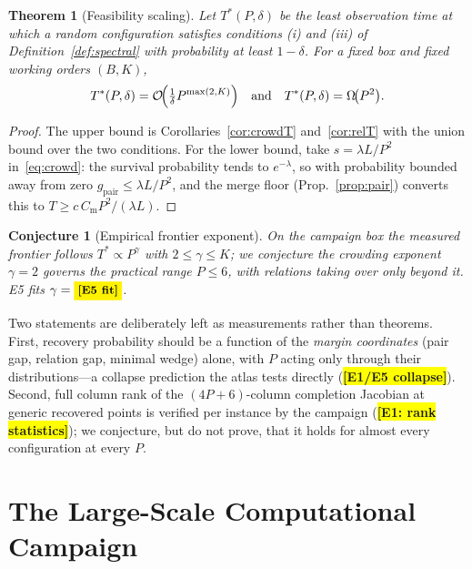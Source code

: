 \documentclass[twocolumn,preprintnumbers,amsmath,amssymb,pra,floatfix]{revtex4-2}
\newcommand{\bigO}{\mathcal{O}}
\newtheorem{theorem}{Theorem}
\newtheorem{conjecture}{Conjecture}
\newcommand{\PH}[1]{\colorbox{yellow}{\textbf{\small [#1]}}}
\begin{document}
\begin{theorem}[Feasibility scaling]
\label{thm:frontier}
Let $T^{*}(P,\delta)$ be the least observation time at which a random
configuration satisfies conditions (i) and (iii) of
Definition~\ref{def:spectral} with probability at least $1-\delta$.
For a fixed box and fixed working orders $(B,K)$,
\begin{equation}
  T^{*}(P,\delta)=\bigO\!\Bigl(\tfrac{1}{\delta}P^{\max(2,K)}\Bigr)
  \quad\text{and}\quad
  T^{*}(P,\delta)=\Omega\!\bigl(P^{2}\bigr).
  \label{eq:frontier}
\end{equation}
\end{theorem}
\begin{proof}
The upper bound is
Corollaries~\ref{cor:crowdT} and~\ref{cor:relT} with the union bound
over the two conditions.  For the lower bound, take
$s=\lambda L/P^{2}$ in~\eqref{eq:crowd}: the survival probability
tends to $e^{-\lambda}$, so with probability bounded away from zero
$g_{\mathrm{pair}}\le\lambda L/P^{2}$, and the merge floor
(Prop.~\ref{prop:pair}) converts this to
$T\ge c\,C_{\mathrm{m}}P^{2}/(\lambda L)$.
\end{proof}

\begin{conjecture}[Empirical frontier exponent]
\label{conj:frontier}
On the campaign box the measured frontier follows
$T^{*}\propto P^{\gamma}$ with
$2\le\gamma\le K$; we conjecture the crowding exponent $\gamma=2$
governs the practical range $P\le6$, with relations taking over only
beyond it.  E5 fits $\gamma=\PH{E5 fit}$.
\end{conjecture}

Two statements are deliberately left as measurements rather than
theorems.  First, recovery probability should be a function of the
\emph{margin coordinates} (pair gap, relation gap, minimal wedge)
alone, with $P$ acting only through their distributions---a collapse
prediction the atlas tests directly (\PH{E1/E5 collapse}).  Second,
full column rank of the $(4P+6)$-column completion Jacobian at
generic recovered points is verified per instance by the campaign
(\PH{E1: rank statistics}); we conjecture, but do not prove, that it
holds for almost every configuration at every $P$.

\section{The Large-Scale Computational Campaign}
\label{sec:campaign}
\end{document}
